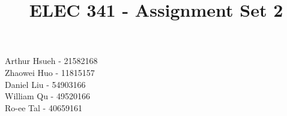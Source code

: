 \documentclass[12pt]{article}
\begin{document}
\title{ELEC 341 - Assignment Set 2}
\maketitle
\vspace{20pt}
\begin{center}
    Arthur Hsueh - 21582168 \\
    Zhaowei Huo - 11815157 \\
    Daniel Liu - 54903166 \\
    William Qu - 49520166 \\
    Ro-ee Tal - 40659161 \\
\end{center}
\pagebreak
\end{document}
